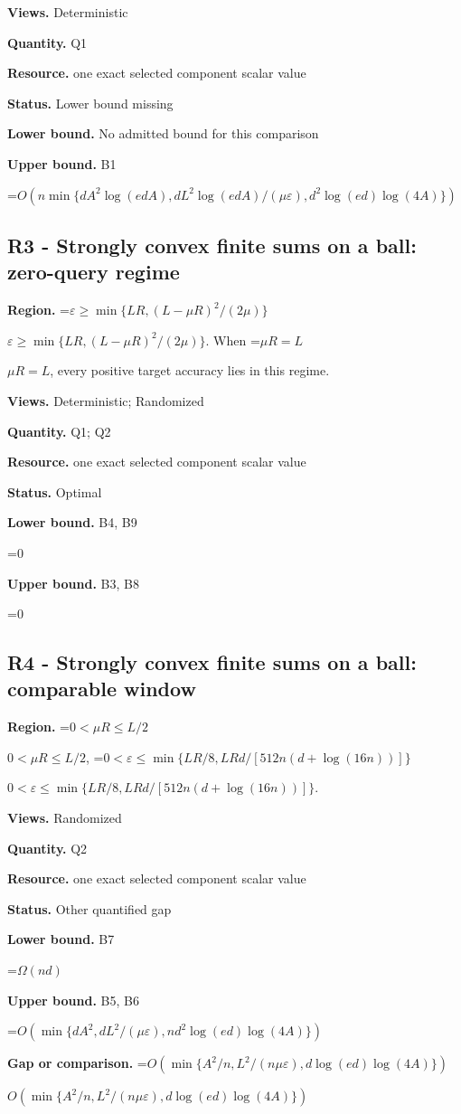 \documentclass[10pt,a4paper]{article}
\newcommand{\AtlasMath}[1]{\par\begingroup\centering\setbox0=\hbox{$\displaystyle #1$}\ifdim\wd0>1.4\linewidth\typeout{ATLAS WIDE FORMULA: \the\wd0}\fi\ifdim\wd0>\linewidth\resizebox{\linewidth}{!}{\box0}\else\box0\fi\par\endgroup}
\newcommand{\AtlasInlineMath}[1]{\begingroup\setbox0=\hbox{$#1$}\ifdim\wd0>.4\linewidth\endgroup\AtlasMath{#1}\else\endgroup$#1$\fi}
\begin{document}
\textbf{Views.} Deterministic

\textbf{Quantity.} Q1

\textbf{Resource.} one exact selected component scalar value

\textbf{Status.} Lower bound missing

\textbf{Lower bound.} No admitted bound for this comparison

\textbf{Upper bound.} B1

\AtlasMath{O\!\left(n\min\{dA^2\log(edA),dL^2\log(edA)/(\mu\varepsilon),d^2\log(ed)\log(4A)\}\right)}
\subsection{R3 - Strongly convex finite sums on a ball: zero-query regime}
\textbf{Region.} \AtlasInlineMath{\varepsilon\ge\min\{LR,(L-\mu R)^2/(2\mu)\}}. When \AtlasInlineMath{\mu R=L}, every positive target accuracy lies in this regime.

\textbf{Views.} Deterministic; Randomized

\textbf{Quantity.} Q1; Q2

\textbf{Resource.} one exact selected component scalar value

\textbf{Status.} Optimal

\textbf{Lower bound.} B4, B9

\AtlasMath{0}
\textbf{Upper bound.} B3, B8

\AtlasMath{0}
\subsection{R4 - Strongly convex finite sums on a ball: comparable window}
\textbf{Region.} \AtlasInlineMath{0<\mu R\le L/2}, \AtlasInlineMath{0<\varepsilon\le\min\{LR/8,LRd/[512n(d+\log(16n))]\}}.

\textbf{Views.} Randomized

\textbf{Quantity.} Q2

\textbf{Resource.} one exact selected component scalar value

\textbf{Status.} Other quantified gap

\textbf{Lower bound.} B7

\AtlasMath{\Omega(nd)}
\textbf{Upper bound.} B5, B6

\AtlasMath{O(\min\{dA^2,dL^2/(\mu\varepsilon),nd^2\log(ed)\log(4A)\})}
\textbf{Gap or comparison.} \AtlasInlineMath{O(\min\{A^2/n,L^2/(n\mu\varepsilon),d\log(ed)\log(4A)\})}
\end{document}
